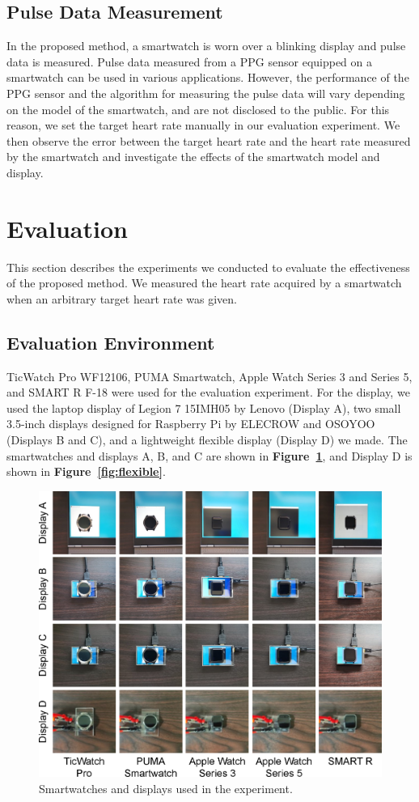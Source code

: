 \documentclass[sigchi,authordraft]{acmart}
\newcommand\figref[1]{\textbf{Figure~\ref{fig:#1}}}
\begin{document}
\subsection{Pulse Data Measurement}
In the proposed method, a smartwatch is worn over a blinking display and pulse data is measured. Pulse data measured from a PPG sensor equipped on a smartwatch can be used in various applications. However, the performance of the PPG sensor and the algorithm for measuring the pulse data will vary depending on the model of the smartwatch, and are not disclosed to the public. For this reason, we set the target heart rate manually in our evaluation experiment. We then observe the error between the target heart rate and the heart rate measured by the smartwatch and investigate the effects of the smartwatch model and display.



\section{Evaluation}
\label{sec:evaluation}
This section describes the experiments we conducted to evaluate the effectiveness of the proposed method. We measured the heart rate acquired by a smartwatch when an arbitrary target heart rate was given.

\subsection{Evaluation Environment}
TicWatch Pro WF12106, PUMA Smartwatch, Apple Watch Series 3 and Series 5, and SMART R F-18 were used for the evaluation experiment. For the display, we used the laptop display of Legion 7 15IMH05 by Lenovo (Display A), two small 3.5-inch displays designed for Raspberry Pi by ELECROW and OSOYOO (Displays B and C), and a lightweight flexible display \cite{flexible_display} (Display D) we made. The smartwatches and displays A, B, and C are shown in \figref{smartwatches}, and Display D is shown in \figref{flexible}.

\begin{figure}[!t]
  \centering
  \includegraphics[width=0.78\linewidth]{figures/smartwatches.eps}
  \caption{Smartwatches and displays used in the experiment.}
  \label{fig:smartwatches}
\end{figure}
\end{document}
